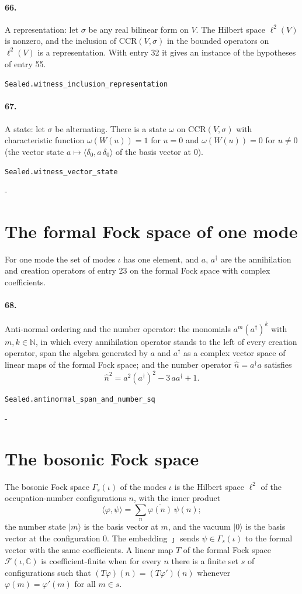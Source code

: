 \documentclass[11pt]{article}
\makeatletter
\newcommand{\keepspace}[1]{\par\penalty-100\begingroup\setlength{\dimen@}{#1}\dimen@ii\pagegoal\advance\dimen@ii-\pagetotal\ifdim\dimen@>\dimen@ii\ifdim\dimen@ii>\z@\vfil\fi\break\fi\endgroup}
\makeatother
\begin{document}
\paragraph{66.} A representation: let $\sigma$ be any real bilinear form on $V$. The Hilbert space $\ell^2(V)$ is nonzero, and the inclusion of $\mathrm{CCR}(V, \sigma)$ in the bounded operators on $\ell^2(V)$ is a representation. With entry 32 it gives an instance of the hypotheses of entry 55.\par{\footnotesize\texttt{Sealed.witness\_inclusion\_representation}}

\paragraph{67.} A state: let $\sigma$ be alternating. There is a state $\omega$ on $\mathrm{CCR}(V, \sigma)$ with characteristic function $\omega(W(u)) = 1$ for $u = 0$ and $\omega(W(u)) = 0$ for $u \ne 0$ (the vector state $a \mapsto \langle \delta_0, a\, \delta_0 \rangle$ of the basis vector at $0$).\par{\footnotesize\texttt{Sealed.witness\_vector\_state}}

\keepspace{14\baselineskip}\section*{The formal Fock space of one mode}
For one mode the set of modes $\iota$ has one element, and $a$, $a^\dagger$ are the annihilation and creation operators of entry 23 on the formal Fock space with complex coefficients.

\paragraph{68.} Anti-normal ordering and the number operator: the monomials $a^m (a^\dagger)^k$ with $m, k \in \mathbb N$, in which every annihilation operator stands to the left of every creation operator, span the algebra generated by $a$ and $a^\dagger$ as a complex vector space of linear maps of the formal Fock space; and the number operator $\hat n = a^\dagger a$ satisfies \[\hat n^2 = a^2 (a^\dagger)^2 - 3\, a a^\dagger + 1.\]\par{\footnotesize\texttt{Sealed.antinormal\_span\_and\_number\_sq}}

\keepspace{14\baselineskip}\section*{The bosonic Fock space}
The bosonic Fock space $\Gamma_s(\iota)$ of the modes $\iota$ is the Hilbert space $\ell^2$ of the occupation-number configurations $n$, with the inner product \[\langle\varphi, \psi\rangle = \sum_n \overline{\varphi(n)}\, \psi(n);\] the number state $|m\rangle$ is the basis vector at $m$, and the vacuum $|0\rangle$ is the basis vector at the configuration $0$. The embedding $\jmath$ sends $\psi \in \Gamma_s(\iota)$ to the formal vector with the same coefficients. A linear map $T$ of the formal Fock space $\mathcal F(\iota, \mathbb C)$ is coefficient-finite when for every $n$ there is a finite set $s$ of configurations such that $(T\varphi)(n) = (T\varphi')(n)$ whenever $\varphi(m) = \varphi'(m)$ for all $m \in s$.
\end{document}

